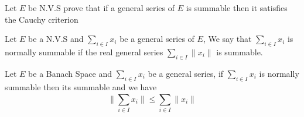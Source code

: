 \divider
	\begin{center}
		Let $E $ be N.V.S prove that if a general 
		series of $E $ is summable 
		then it satisfies the Cauchy criterion
	\end{center}
\divider
\begin{definition}[]
Let $E $ be a N.V.S and $\sum_{ i \in  I}^{} x_{i} $  
be a general series of $E $, We say that $\sum_{i \in  I}^{} x_{i} $  
is normally summable if the real general 
series $\sum_{ i \in I}^{} \| x_{i} \|  $  
is summable.
\end{definition}
\begin{theorem}[]
Let $E $ be a Banach Space and $\sum_{i \in  I}^{} x_{i}  $  
be a general series, if $\sum_{i \in  I}^{} x_{i} $  is 
normally summable then its summable and we have 
\[
\| \sum_{i \in  I}^{} x_{i} \|  \leq 
\sum_{i \in  I}^{}  
\| x_{i} \| 
\]
\end{theorem}
